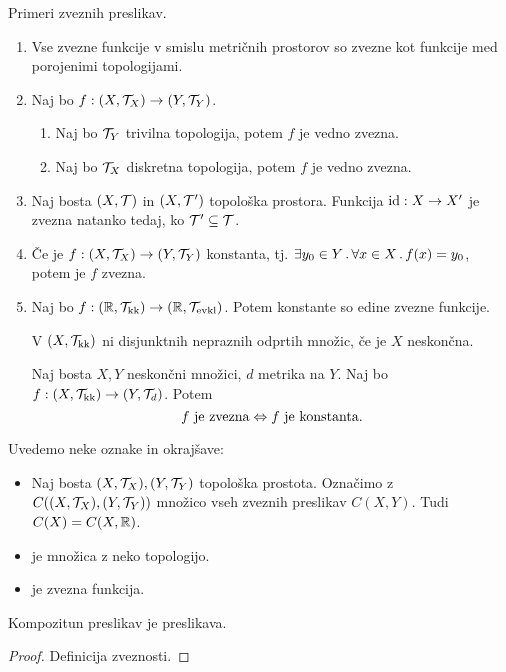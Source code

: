 \begin{primer}
    Primeri zveznih preslikav.
    \begin{enumerate}
        \item Vse zvezne funkcije v smislu metričnih prostorov so zvezne kot funkcije med porojenimi topologijami.
        \item Naj bo $f: (X, \mathcal{T}_X) \to (Y, \mathcal{T}_Y)$. 
        \begin{enumerate}
            \item Naj bo $\mathcal{T}_Y$ trivilna topologija, potem $f$ je vedno zvezna.
            \item Naj bo $\mathcal{T}_X$ diskretna topologija, potem $f$ je vedno zvezna.
        \end{enumerate}
        \item Naj bosta $(X, \mathcal{T})$ in $(X, \mathcal{T}')$ topološka prostora. Funkcija $\operatorname{id}: X \to X'$ je zvezna natanko tedaj, ko $\mathcal{T}' \subseteq \mathcal{T}$.
        \item Če je $f: (X, \mathcal{T}_X) \to (Y, \mathcal{T}_Y)$ konstanta, tj. $\exists y_0 \in Y \,.\, \forall x \in X \,.\, f(x) = y_0$, potem je $f$ zvezna.
        \item Naj bo $f: (\mathbb{R}, \mathcal{T}_{\text{kk}}) \to (\mathbb{R}, \mathcal{T}_{\text{evkl}})$. Potem konstante so edine zvezne funkcije. 
        
         V $(X, \mathcal{T}_{\text{kk}})$ ni disjunktnih nepraznih odprtih množic, če je $X$ neskončna.
        
         Naj bosta $X, Y$ neskončni množici, $d$ metrika na $Y$. Naj bo $f: (X, \mathcal{T}_{\text{kk}}) \to (Y, \mathcal{T}_d)$. Potem 
        $$f \text{ je zvezna} \Leftrightarrow f \text{ je konstanta}.$$
    \end{enumerate}
\end{primer}

Uvedemo neke oznake in okrajšave:
\begin{itemize}
    \item Naj bosta $(X, \mathcal{T}_X), (Y, \mathcal{T}_Y)$ topološka prostota. Označimo z $C((X, \mathcal{T}_X), (Y, \mathcal{T}_Y))$ množico vseh zveznih preslikav $C(X, Y)$. Tudi $C(X) = C(X, \mathbb{R})$.
    \item {} je množica z neko topologijo.
    \item {} je zvezna funkcija.
\end{itemize}

\begin{trditev}
    Kompozitun preslikav je preslikava.
\end{trditev}

\begin{proof}
    Definicija zveznosti.
\end{proof}

